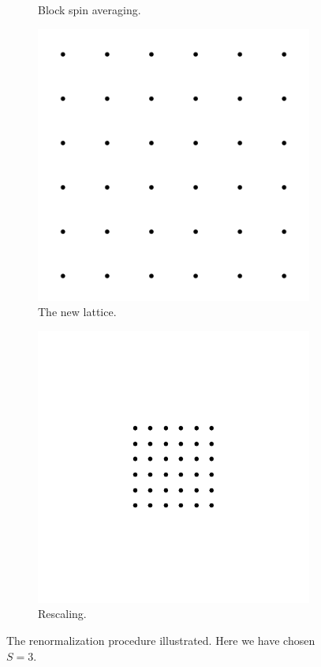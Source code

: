 \begin{figure}[htp]
\begin{subfigure}{.25\textwidth}
	\caption{Block spin averaging.}
	\label{renorm_1}
\end{subfigure}%
\begin{subfigure}{.25\textwidth}
	\centering
	\includegraphics[width=.9\linewidth]{img/chap2/renorm_step2.pdf}
	\caption{The new lattice.}
	\label{renorm_2}
\end{subfigure}%
\begin{subfigure}{.25\textwidth}
	\centering
	\includegraphics[width=.9\linewidth]{img/chap2/renorm_step3.pdf}
	\caption{Rescaling.}
	\label{renorm_3}
\end{subfigure}
\caption{The renormalization procedure illustrated. Here we have chosen $S = 3$.}
\label{fig:renorm_proc}
\end{figure}

